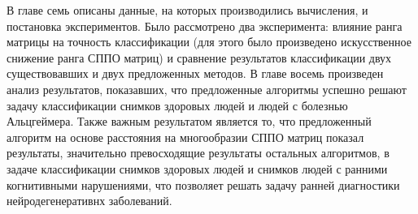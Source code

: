 \indent В главе семь описаны данные, на которых производились вычисления, и постановка экспериментов. Было рассмотрено два эксперимента: влияние ранга матрицы на точность классификации (для этого было произведено искусственное снижение ранга СППО матриц) и сравнение результатов классификации двух существовавших и двух предложенных методов. В главе восемь произведен анализ результатов, показавших, что предложенные алгоритмы успешно решают задачу классификации снимков здоровых людей и людей с болезнью Альцгеймера. Также важным результатом является то, что предложенный алгоритм на основе расстояния на многообразии СППО матриц показал результаты, значительно превосходящие результаты остальных алгоритмов, в задаче классификации снимков здоровых людей и снимков людей с ранними когнитивными нарушениями, что позволяет решать задачу ранней диагностики нейродегенеративнх заболеваний.